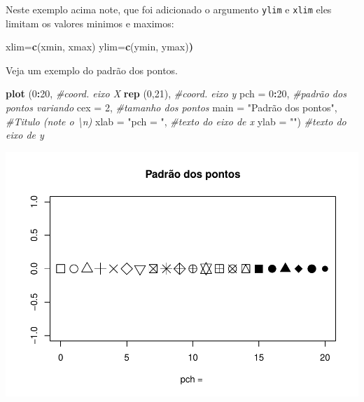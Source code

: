 \documentclass[]{book}
\newenvironment{Shaded}{\begin{snugshade}}{\end{snugshade}}
\newcommand{\CommentTok}[1]{\textcolor[rgb]{0.56,0.35,0.01}{\textit{#1}}}
\newcommand{\DataTypeTok}[1]{\textcolor[rgb]{0.13,0.29,0.53}{#1}}
\newcommand{\DecValTok}[1]{\textcolor[rgb]{0.00,0.00,0.81}{#1}}
\newcommand{\ErrorTok}[1]{\textcolor[rgb]{0.64,0.00,0.00}{\textbf{#1}}}
\newcommand{\KeywordTok}[1]{\textcolor[rgb]{0.13,0.29,0.53}{\textbf{#1}}}
\newcommand{\NormalTok}[1]{#1}
\newcommand{\OperatorTok}[1]{\textcolor[rgb]{0.81,0.36,0.00}{\textbf{#1}}}
\newcommand{\StringTok}[1]{\textcolor[rgb]{0.31,0.60,0.02}{#1}}
\begin{document}
Neste exemplo acima note, que foi adicionado o argumento \texttt{ylim} e \texttt{xlim} eles limitam os valores minimos e maximos:

\begin{Shaded}
\begin{Highlighting}[]
\NormalTok{xlim=}\KeywordTok{c}\NormalTok{(xmin, xmax) ylim=}\KeywordTok{c}\NormalTok{(ymin, ymax)}\ErrorTok{)}
\end{Highlighting}
\end{Shaded}

Veja um exemplo do padrão dos pontos.

\begin{Shaded}
\begin{Highlighting}[]
\KeywordTok{plot}\NormalTok{ (}\DecValTok{0}\OperatorTok{:}\DecValTok{20}\NormalTok{,                         }\CommentTok{#coord. eixo X}
      \KeywordTok{rep}\NormalTok{ (}\DecValTok{0}\NormalTok{,}\DecValTok{21}\NormalTok{),                   }\CommentTok{#coord. eixo y}
      \DataTypeTok{pch =} \DecValTok{0}\OperatorTok{:}\DecValTok{20}\NormalTok{,                   }\CommentTok{#padrão dos pontos variando}
      \DataTypeTok{cex =} \DecValTok{2}\NormalTok{,                      }\CommentTok{#tamanho dos pontos}
      \DataTypeTok{main =} \StringTok{"Padrão dos pontos"}\NormalTok{, }\CommentTok{#Titulo (note o \textbackslash{}n)}
      \DataTypeTok{xlab =} \StringTok{"pch = "}\NormalTok{,              }\CommentTok{#texto do eixo de x}
      \DataTypeTok{ylab =} \StringTok{""}\NormalTok{)                    }\CommentTok{#texto do eixo de y}
\end{Highlighting}
\end{Shaded}

\includegraphics{TudodoR_files/figure-latex/unnamed-chunk-157-1.pdf}
\end{document}
